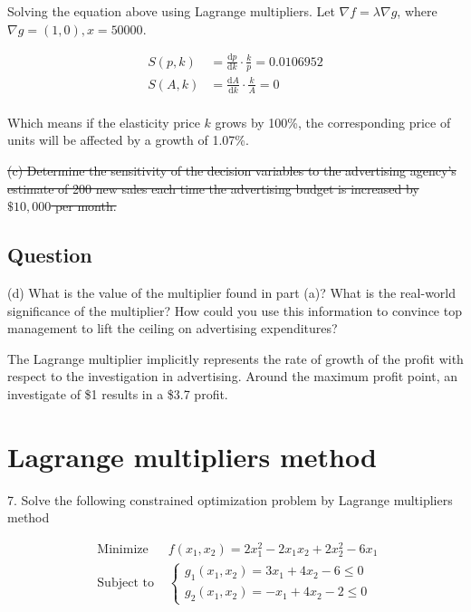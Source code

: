 \documentclass[11pt]{article}
\begin{document}
Solving the equation above using Lagrange multipliers. Let $\nabla f  = \lambda \nabla g$, where $\nabla g = (1,0), x = 50000$.

$$
\begin{aligned}
	S(p,k )&= \frac{\mathrm d p }{\mathrm d k}\cdot \frac{k}{p} = 0.0106952\\
	S(A,k )&= \frac{\mathrm d A }{\mathrm d k}\cdot \frac{k}{A} = 0\\
\end{aligned}
$$

Which means if the elasticity price $k$ grows by 100\%, the corresponding price of units will be affected by a growth of 1.07\%.




\sout{(c) Determine the sensitivity of the decision variables to the advertising agency's estimate of 200 new sales each time the advertising budget is increased by $\$ 10,000$ per month.}
    
\subsection{Question}
(d) What is the value of the multiplier found in part (a)? What is the real-world significance of the multiplier? How could you use this information to convince top management to lift the ceiling on advertising expenditures?

The Lagrange multiplier implicitly represents the rate of growth of the profit with respect to the investigation in advertising. Around the maximum profit point, an investigate of \$1 results in a \$3.7 profit.


\section{Lagrange multipliers method}
7. Solve the following constrained optimization problem by Lagrange multipliers method

$$
\begin{aligned}
\text { Minimize } & f\left(x_{1}, x_{2}\right)=2 x_{1}^{2}-2 x_{1} x_{2}+2 x_{2}^{2}-6 x_{1} \\
\text { Subject to } &\left\{\begin{array}{l}
g_{1}\left(x_{1}, x_{2}\right)=3 x_{1}+4 x_{2}-6 \leq 0 \\
g_{2}\left(x_{1}, x_{2}\right)=-x_{1}+4 x_{2}-2 \leq 0
\end{array}\right.
\end{aligned}
$$
\end{document}
